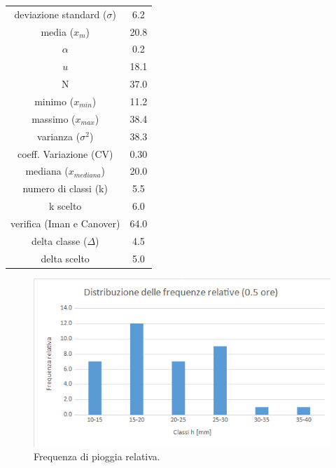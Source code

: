 \begin{table}[H] \centering
        \begin{tabular}{cc}
            \toprule
        deviazione standard ($\sigma$) & 6.2  \\
        media ($x_m$)              & 20.8 \\
        $\alpha$            & 0.2  \\
        $u$           & 18.1\\
    N                & 37.0 \\
minimo ($x_{min}$)             & 11.2 \\
massimo ($x_{max}$)            & 38.4 \\
varianza ($\sigma^2$)             & 38.3 \\
coeff. Variazione (CV)    & 0.30 \\
mediana ($x_{mediana}$)        & 20.0 \\
numero di classi (k)      & 5.5  \\
k scelto                 & 6.0  \\
verifica (Iman e Canover) & 64.0 \\
delta classe ($\Delta$)          & 4.5  \\
delta scelto             & 5.0 \\
        \bottomrule
        \end{tabular}
\end{table}    

\begin{figure}[H]\centering
    \includegraphics[scale=.6]{immagini/freq_piogg_rel_05ore.png}
    \caption{Frequenza di pioggia relativa.}
  \label{freq_rel_piogg_05ore}
\end{figure}

